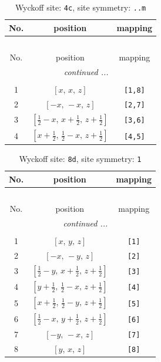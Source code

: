 \documentclass[fleqn,8pt]{jsarticle}
\begin{document}
\renewcommand{\arraystretch}{1.2}
\begin{longtable}{ccc}
\caption{Wyckoff site: {\tt 4c}, site symmetry: {\tt ..m}}
 \\
 \hline \hline
No. & position & mapping \\ \hline \endfirsthead

\multicolumn{2}{l}{\tablename\ \thetable{}} \\
 \hline \hline
No. & position & mapping \\ \hline \endhead

 \hline \hline
\multicolumn{2}{r}{\footnotesize\it continued ...} \\ \endfoot

 \hline \hline
\multicolumn{2}{r}{} \\ \endlastfoot

1 & $\left[ x,\, x,\, z \right]$ & {\tt [1,8]} \\ \hline
2 & $\left[ - x,\, - x,\, z \right]$ & {\tt [2,7]} \\ \hline
3 & $\left[ \frac{1}{2} - x,\, x + \frac{1}{2},\, z + \frac{1}{2} \right]$ & {\tt [3,6]} \\ \hline
4 & $\left[ x + \frac{1}{2},\, \frac{1}{2} - x,\, z + \frac{1}{2} \right]$ & {\tt [4,5]} \\
\end{longtable}
\renewcommand{\arraystretch}{1.2}
\begin{longtable}{ccc}
\caption{Wyckoff site: {\tt 8d}, site symmetry: {\tt 1}}
 \\
 \hline \hline
No. & position & mapping \\ \hline \endfirsthead

\multicolumn{2}{l}{\tablename\ \thetable{}} \\
 \hline \hline
No. & position & mapping \\ \hline \endhead

 \hline \hline
\multicolumn{2}{r}{\footnotesize\it continued ...} \\ \endfoot

 \hline \hline
\multicolumn{2}{r}{} \\ \endlastfoot

1 & $\left[ x,\, y,\, z \right]$ & {\tt [1]} \\ \hline
2 & $\left[ - x,\, - y,\, z \right]$ & {\tt [2]} \\ \hline
3 & $\left[ \frac{1}{2} - y,\, x + \frac{1}{2},\, z + \frac{1}{2} \right]$ & {\tt [3]} \\ \hline
4 & $\left[ y + \frac{1}{2},\, \frac{1}{2} - x,\, z + \frac{1}{2} \right]$ & {\tt [4]} \\ \hline
5 & $\left[ x + \frac{1}{2},\, \frac{1}{2} - y,\, z + \frac{1}{2} \right]$ & {\tt [5]} \\ \hline
6 & $\left[ \frac{1}{2} - x,\, y + \frac{1}{2},\, z + \frac{1}{2} \right]$ & {\tt [6]} \\ \hline
7 & $\left[ - y,\, - x,\, z \right]$ & {\tt [7]} \\ \hline
8 & $\left[ y,\, x,\, z \right]$ & {\tt [8]} \\
\end{longtable}
\end{document}
